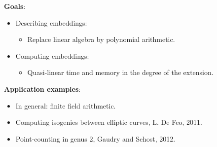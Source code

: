\documentclass[12pt]{beamer}
\begin{document}
\begin{frame}
	
	
	\vspace*{3mm}
	\textbf{Goals}:
	\begin{itemize}
		\item Describing embeddings:
		\begin{itemize}
			\item Replace linear algebra by polynomial arithmetic.
		\end{itemize}
		\item Computing embeddings:
		\begin{itemize}
			\item Quasi-linear time and memory in the degree of the	extension.
		\end{itemize}
	\end{itemize}
	
	\vspace*{3mm}
	\textbf{Application examples}:
	\begin{itemize}
		\item In general: finite field arithmetic.
		\item Computing isogenies between elliptic curves, L. De Feo, 2011.
		\item Point-counting in genus 2, Gaudry and Schost, 2012.
	\end{itemize}
	
\end{frame}

\end{document}
